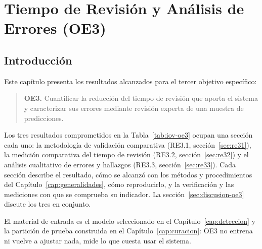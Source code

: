 \chapter{Tiempo de Revisión y Análisis de Errores (OE3)}
\label{cap:utilidad}

\section{Introducción}

Este capítulo presenta los resultados alcanzados para el tercer objetivo
específico:

\begin{quote}
    \textbf{OE3.} Cuantificar la reducción del tiempo de revisión que aporta el
    sistema y caracterizar sus errores mediante revisión experta de una muestra de
    predicciones.
\end{quote}

Los tres resultados comprometidos en la Tabla~\ref{tab:iov-oe3} ocupan una sección
cada uno: la metodología de validación comparativa (RE3.1,
sección~\ref{sec:re31}), la medición comparativa del tiempo de revisión (RE3.2,
sección~\ref{sec:re32}) y el análisis cualitativo de errores y hallazgos (RE3.3,
sección~\ref{sec:re33}). Cada sección describe el resultado, cómo se alcanzó con
los métodos y procedimientos del Capítulo~\ref{cap:generalidades}, cómo
reproducirlo, y la verificación y las mediciones con que se comprueba su
indicador. La sección~\ref{sec:discusion-oe3} discute los tres en conjunto.

El material de entrada es el modelo seleccionado en el
Capítulo~\ref{cap:deteccion} y la partición de prueba construida en el
Capítulo~\ref{cap:curacion}: OE3 no entrena ni vuelve a ajustar nada, mide lo que
cuesta usar el sistema.

